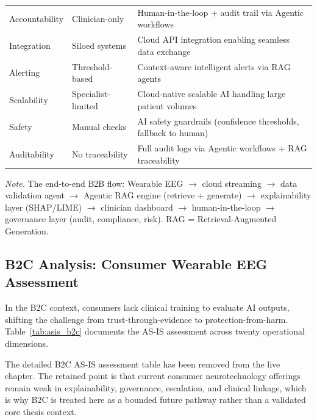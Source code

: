 {\begin{xltabular}{\textwidth}{@{} >{\raggedright\arraybackslash}p{3.0cm} >{\raggedright\arraybackslash}p{3.2cm} L @{}}
\addlinespace
Accountability & Clinician-only & Human-in-the-loop + audit trail via Agentic workflows \\
\addlinespace
Integration & Siloed systems & Cloud API integration enabling seamless data exchange \\
\addlinespace
Alerting & Threshold-based & Context-aware intelligent alerts via RAG agents \\
\addlinespace
Scalability & Specialist-limited & Cloud-native scalable AI handling large patient volumes \\
\addlinespace
Safety & Manual checks & AI safety guardrails (confidence thresholds, fallback to human) \\
\addlinespace
Auditability & No traceability & Full audit logs via Agentic workflows + RAG traceability \\
\end{xltabular}}
\vspace{0.5em}
\noindent\textit{Note.} The end-to-end B2B flow: Wearable EEG $\to$ cloud streaming $\to$ data validation agent $\to$ Agentic RAG engine (retrieve + generate) $\to$ explainability layer (SHAP/LIME) $\to$ clinician dashboard $\to$ human-in-the-loop $\to$ governance layer (audit, compliance, risk). RAG = Retrieval-Augmented Generation.
\fi %

\label{sec:b2b_tobe}
\label{tab:b2b_tobe}

\subsection{B2C Analysis: Consumer Wearable EEG Assessment}
\label{sec:b2c_analysis}
\label{sec:asis_b2c}

In the B2C context, consumers lack clinical training to evaluate AI outputs, shifting the challenge from trust-through-evidence to protection-from-harm. Table~\ref{tab:asis_b2c} documents the AS-IS assessment across twenty operational dimensions.

\noindent The detailed B2C AS-IS assessment table has been removed from the live chapter. The retained point is that current consumer neurotechnology offerings remain weak in explainability, governance, escalation, and clinical linkage, which is why B2C is treated here as a bounded future pathway rather than a validated core thesis context.
\label{tab:asis_b2c}
\label{tab:b2c_as_is}



